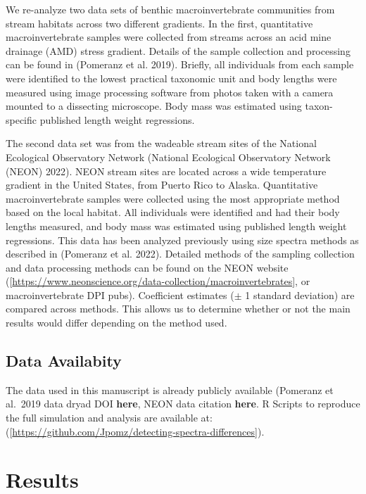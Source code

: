 \documentclass[
]{article}
\begin{document}
We re-analyze two data sets of benthic macroinvertebrate communities
from stream habitats across two different gradients. In the first,
quantitative macroinvertebrate samples were collected from streams
across an acid mine drainage (AMD) stress gradient. Details of the
sample collection and processing can be found in (Pomeranz et al. 2019).
Briefly, all individuals from each sample were identified to the lowest
practical taxonomic unit and body lengths were measured using image
processing software from photos taken with a camera mounted to a
dissecting microscope. Body mass was estimated using taxon-specific
published length weight regressions.

The second data set was from the wadeable stream sites of the National
Ecological Observatory Network (National Ecological Observatory Network
(NEON) 2022). NEON stream sites are located across a wide temperature
gradient in the United States, from Puerto Rico to Alaska. Quantitative
macroinvertebrate samples were collected using the most appropriate
method based on the local habitat. All individuals were identified and
had their body lengths measured, and body mass was estimated using
published length weight regressions. This data has been analyzed
previously using size spectra methods as described in (Pomeranz et al.
2022). Detailed methods of the sampling collection and data processing
methods can be found on the NEON website
({[}\url{https://www.neonscience.org/data-collection/macroinvertebrates}{]},
or macroinvertebrate DPI pubs). Coefficient estimates (\(\pm\) 1
standard deviation) are compared across methods. This allows us to
determine whether or not the main results would differ depending on the
method used.

\hypertarget{data-availabity}{%
\subsection{Data Availabity}\label{data-availabity}}

The data used in this manuscript is already publicly available (Pomeranz
et al.~2019 data dryad DOI \textbf{here}, NEON data citation
\textbf{here}. R Scripts to reproduce the full simulation and analysis
are available at:
({[}\url{https://github.com/Jpomz/detecting-spectra-differences}{]}).

\hypertarget{results}{%
\section{Results}\label{results}}
\end{document}
